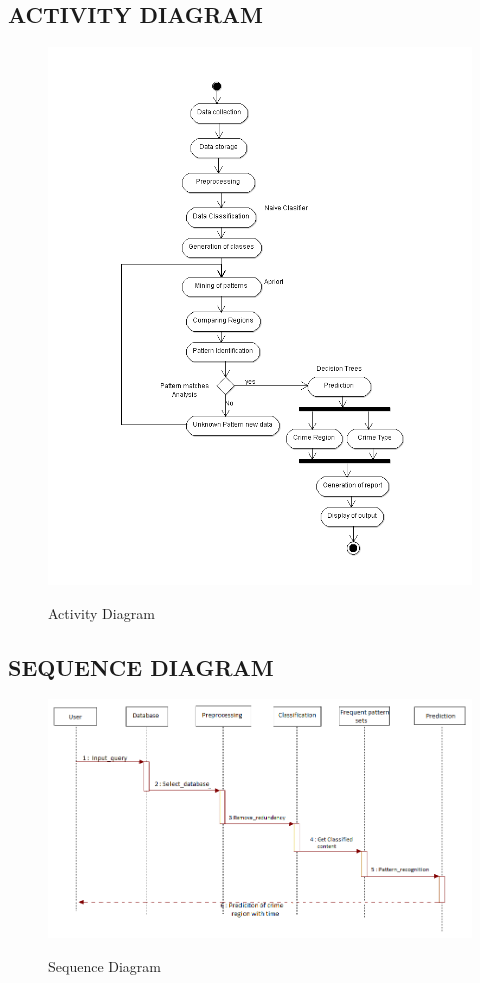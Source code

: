 \documentclass[12pt]{extreport}
\begin{document}
    \subsection{ACTIVITY DIAGRAM}
    \begin{figure}[H]
  \centering
  \includegraphics[scale=0.75]{ACTIVITYDIAGCRIME.png}\\
  \caption{Activity Diagram}
  
\end{figure}
    
   \pagebreak 
    \subsection{SEQUENCE DIAGRAM}
    \begin{figure}[H]
  \centering
  \includegraphics[scale=0.65]{SEQU.png}\\
  \caption{Sequence Diagram}
  
\end{figure}
 \pagebreak   
\end{document}
